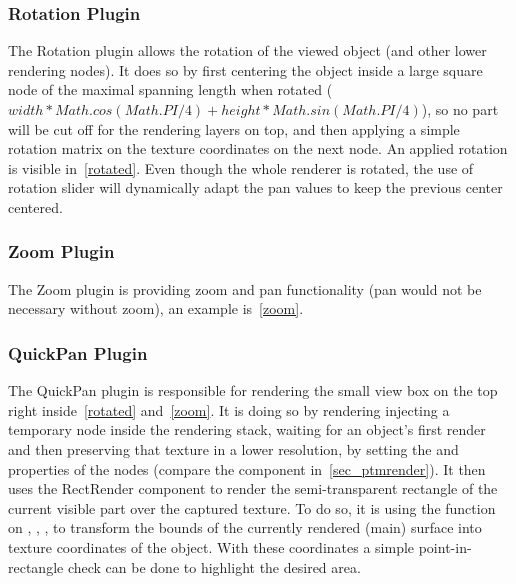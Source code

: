 \subsubsection{Rotation Plugin}
The Rotation plugin allows the rotation of the viewed object (and other lower
rendering nodes). It does so by first centering the object inside a large square
node of the maximal spanning length when rotated ($width * Math.cos(Math.PI / 4) + height * Math.sin(Math.PI /
  4)$), so no part will be cut off for the rendering layers on top, and then
applying a simple rotation matrix on the texture coordinates on the next node.
An applied rotation is visible in~\autoref{rotated}. Even though the whole
renderer is rotated, the use of rotation slider will dynamically adapt the pan
values to keep the previous center centered.

\subsubsection{Zoom Plugin}
The Zoom plugin is providing zoom and pan functionality (pan would not be
necessary without zoom), an example is~\autoref{zoom}.

\subsubsection{QuickPan Plugin}
The QuickPan plugin is responsible for rendering the small view box on the top
right inside~\autoref{rotated} and~\autoref{zoom}. It is doing so by
rendering injecting a temporary node inside the rendering stack, waiting for an
object's first render and then preserving that texture in a lower resolution, by setting the  and  properties of
the nodes (compare the component in~\autoref{sec_ptmrender}). It then uses the
RectRender component to render the semi-transparent rectangle of the current
visible part over the captured texture. To do so, it is using the  function on \code{[0, 0]},
\code{[0,1]}, \code{[1,1]}, \code{[0,1]} to transform the bounds of the
currently rendered (main) surface into texture coordinates of the object. With
these coordinates a simple point-in-rectangle check can be done to highlight the
desired area.


